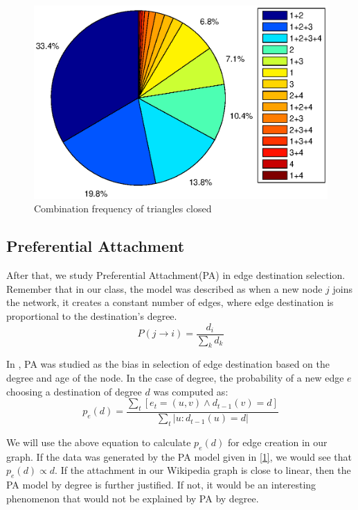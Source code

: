 \documentclass[10pt]{article}
\begin{document}
\begin{multicols}{2}
\begin{figure}[H]
    \includegraphics[scale=0.45, trim = 6cm 1cm 0cm 0cm]{./graphs/15_tri.eps}
    \caption{Combination frequency of triangles closed} \label{fig:combo15}
\end{figure}


\subsection{Preferential Attachment}
After that, we study Preferential Attachment(PA) in edge destination selection. Remember that in our class, the model was described as when a new node $j$ joins the network, it creates a constant number of edges, where edge destination is proportional to the destination's degree.
\begin{equation}
\label{1}
P(j\rightarrow i)=\frac{d_i}{\sum\limits_{k}d_k}
\end{equation}

In \cite{leskovec2008microscopic}, PA was studied as the bias in selection of edge destination based on the degree and age of the node. In the case of degree, the probability of a new edge $e$ choosing a destination of degree $d$ was computed as:
\begin{equation}
\label{2}
p_e(d)=\frac{\sum\limits_{t}[e_t=(u,v)\wedge d_{t-1}(v)=d]}{\sum\limits_{t}|u:d_{t-1}(u)=d|}
\end{equation}

We will use the above equation to calculate $p_e(d)$ for edge creation in our graph. If the data was generated by the PA model given in \eqref{1}, we would see that $p_e(d)\propto d$. If the attachment in our Wikipedia graph is close to linear, then the PA model by degree is further justified. If not, it would be an interesting phenomenon that would not be explained by PA by degree.


\end{multicols}
\end{document}

